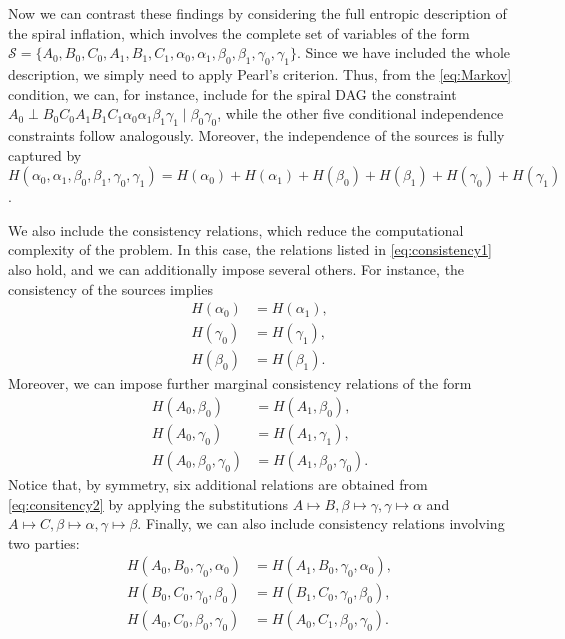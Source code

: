 \documentclass[reprint,pra, twocolumn, amsmath,amssymb,
 aps,superscriptaddress,]{revtex4-2}
\begin{document}
Now we can contrast these findings by considering the full entropic description of the spiral inflation, which involves the complete set of variables of the form $\mathcal{S}=\{A_0, B_0, C_0, A_1, B_1, C_1, \alpha_0, \alpha_1, \beta_0, \beta_1, \gamma_0, \gamma_1\}$. Since we have included the whole description, we simply need to apply Pearl's criterion. Thus, from the \eqref{eq:Markov} condition, we can, for instance, include for the spiral DAG the constraint
$A_0\perp B_0 C_0 A_1 B_1 C_1 \alpha_0 \alpha_1 \beta_1 \gamma_1 \mid \beta_0 \gamma_0$,
while the other five conditional independence constraints follow analogously. Moreover, the independence of the sources is fully captured by
$H(\alpha_0, \alpha_1, \beta_0, \beta_1, \gamma_0, \gamma_1) = H(\alpha_0)+ H(\alpha_1)+ H(\beta_0)+H(\beta_1)+H(\gamma_0)+ H(\gamma_1)$.

We also include the consistency relations, which reduce the computational complexity of the problem. In this case, the relations listed in \eqref{eq:consistency1} also hold, and we can additionally impose several others. For instance, the consistency of the sources implies
%
\begin{align}
H(\alpha_0) &= H(\alpha_1),\\
H(\gamma_0) &= H(\gamma_1),\\
H(\beta_0) &= H(\beta_1).
\end{align}
%
Moreover, we can impose further marginal consistency relations of the form
\begin{align}\label{eq:consitency2}
H(A_0, \beta_0) &= H(A_1, \beta_0),\\
H(A_0, \gamma_0) &= H(A_1, \gamma_1),\\
H(A_0, \beta_0, \gamma_0) &= H(A_1, \beta_0, \gamma_0).
\end{align}
%
Notice that, by symmetry, six additional relations are obtained from \eqref{eq:consitency2} by applying the substitutions $A\mapsto B, \beta\mapsto\gamma, \gamma\mapsto\alpha$ and $A\mapsto C, \beta\mapsto\alpha, \gamma\mapsto\beta$. Finally, we can also include consistency relations involving two parties:
%
\begin{align}\label{eq:consitency3}
H(A_0, B_0, \gamma_0, \alpha_0) &= H(A_1, B_0, \gamma_0, \alpha_0),\\
H(B_0, C_0, \gamma_0, \beta_0) &= H(B_1, C_0, \gamma_0, \beta_0),\\
H(A_0, C_0, \beta_0, \gamma_0) &= H(A_0, C_1, \beta_0, \gamma_0).
\end{align}
\end{document}
